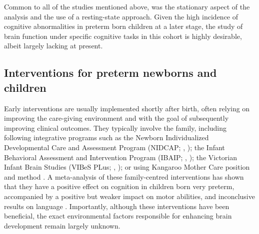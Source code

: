 Common to all of the studies mentioned above, was the stationary aspect of the analysis and the use of a resting-state approach. 
Given the high incidence of cognitive abnormalities in preterm born children at a later stage, the study of brain function under specific cognitive tasks in this cohort is highly desirable, albeit largely lacking at present.

\subsection{Interventions for preterm newborns and children}

Early interventions are usually implemented shortly after birth, often relying on improving the care-giving environment and with the goal of subsequently improving clinical outcomes. They typically involve the family, including following integrative programs such as the Newborn Individualized Developmental Care and Assessment Program (NIDCAP; \citeauthor{Peters2009}, \citeyear{Peters2009}); the Infant Behavioral Assessment and Intervention Program (IBAIP; \citeauthor{VanHus2016}, \citeyear{VanHus2016}); the Victorian Infant Brain Studies (VIBeS PLus; \citeauthor{Spittle2018}, \citeyear{Spittle2018}); or using Kangaroo Mother Care position and method \citep{Peters2009}. A meta-analysis of these family-centred interventions has shown that they have a positive effect on cognition in children born very preterm, accompanied by a positive but weaker impact on motor abilities, and inconclusive results on language \citep{Ferreira2020}. Importantly, although these interventions have been beneficial, the exact environmental factors responsible for enhancing brain development remain largely unknown. 

